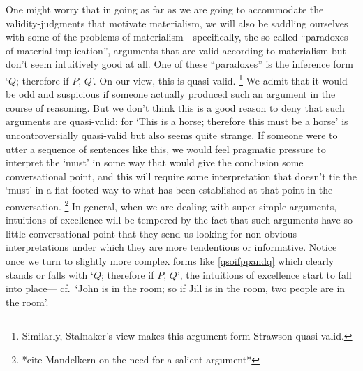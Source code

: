 \documentclass[If.tex]{subfiles}
\begin{document}
One might worry that in going as far as we are going to accommodate the validity-judgments that motivate materialism, we will also be saddling ourselves with some of the problems of materialism---specifically, the so-called “paradoxes of material implication”, arguments that are valid according to materialism but don't seem intuitively good at all. One of these “paradoxes” is the inference form ‘$Q$; therefore if $P$, $Q$’. On our view, this is quasi-valid.%
\footnote{Similarly, Stalnaker's view makes this argument form Strawson-quasi-valid.}
We admit that it would be odd and suspicious if someone actually produced such an argument in the course of reasoning. But we don't think this is a good reason to deny that such arguments are quasi-valid: for ‘This is a horse; therefore this must be a horse’ is uncontroversially quasi-valid but also seems quite strange. If someone were to utter a sequence of sentences like this, we would feel pragmatic pressure to interpret the ‘must’ in some way that would give the conclusion some conversational point, and this will require some interpretation that doesn't tie the ‘must’ in a flat-footed way to what has been established at that point in the conversation.%
\footnote{*cite Mandelkern on the need for a salient argument*} 
In general, when we are dealing with super-simple arguments, intuitions of excellence will be tempered by the fact that such arguments have so little conversational point that they send us looking for non-obvious interpretations under which they are more tendentious or informative. Notice once we turn to slightly more complex forms like \ref{qsoifppandq} which clearly stands or falls with ‘$Q$; therefore if $P$, $Q$’, the intuitions of excellence start to fall into place--- cf.\ ‘John is in the room; so if Jill is in the room, two people are in the room’.  
\end{document}
